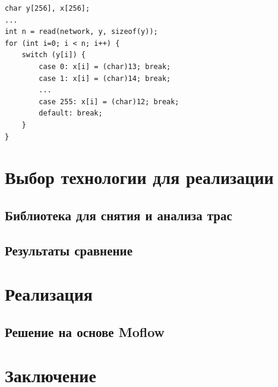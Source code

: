 \begin{lstlisting}[environoment=C_LANG]
char y[256], x[256];
...
int n = read(network, y, sizeof(y));
for (int i=0; i < n; i++) {
    switch (y[i]) {
        case 0: x[i] = (char)13; break;
        case 1: x[i] = (char)14; break;
        ...
        case 255: x[i] = (char)12; break;
        default: break;
    }
}
\end{lstlisting}

\chapter{Выбор технологии для реализации}

\section{Библиотека для снятия и анализа трас}

\section{Результаты сравнение}


\chapter{Реализация}


\section{Решение на основе Moflow}

\chapter{Заключение}




